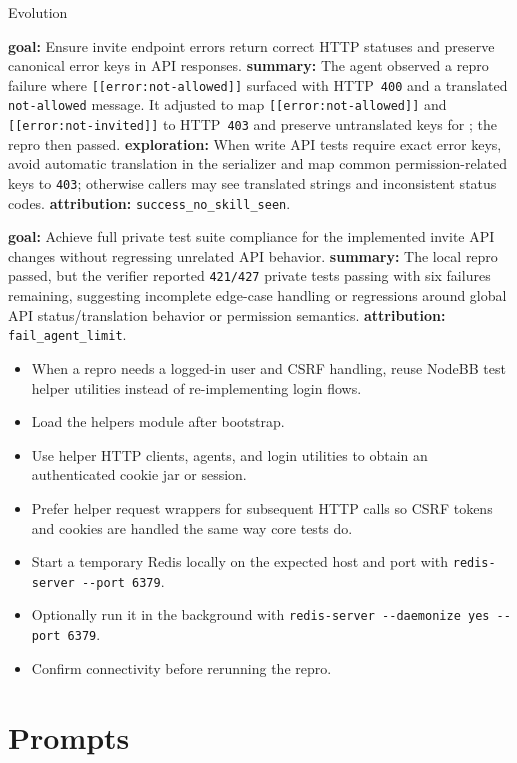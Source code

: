\begin{svpromptbox}{Evolution}
\begin{enumerate}[label=\textnormal{[\arabic*]}, leftmargin=*]
    \item \textbf{goal:} Ensure invite endpoint errors return correct HTTP statuses and preserve canonical error keys in API responses. \textbf{summary:} The agent observed a repro failure where \texttt{[[error:not-allowed]]} surfaced with HTTP~\texttt{400} and a translated \texttt{not-allowed} message. It adjusted  to map \texttt{[[error:not-allowed]]} and \texttt{[[error:not-invited]]} to HTTP~\texttt{403} and preserve untranslated keys for ; the repro then passed. \textbf{exploration:} When write API tests require exact error keys, avoid automatic translation in the  serializer and map common permission-related keys to \texttt{403}; otherwise callers may see translated strings and inconsistent status codes. \textbf{attribution:} \texttt{success\_no\_skill\_seen}.
    \item \textbf{goal:} Achieve full private test suite compliance for the implemented invite API changes without regressing unrelated API behavior. \textbf{summary:} The local repro passed, but the verifier reported \texttt{421/427} private tests passing with six failures remaining, suggesting incomplete edge-case handling or regressions around global API status/translation behavior or permission semantics. \textbf{attribution:} \texttt{fail\_agent\_limit}.
\end{enumerate}

\svpartsep
{}
\begin{itemize}
    \item When a repro needs a logged-in user and CSRF handling, reuse NodeBB test helper utilities instead of re-implementing login flows.
    \item Load the helpers module after bootstrap.
    \item Use helper HTTP clients, agents, and login utilities to obtain an authenticated cookie jar or session.
    \item Prefer helper request wrappers for subsequent HTTP calls so CSRF tokens and cookies are handled the same way core tests do.
\end{itemize}
\begin{itemize}
    \item Start a temporary Redis locally on the expected host and port with \texttt{redis-server -{}-port 6379}.
    \item Optionally run it in the background with \texttt{redis-server -{}-daemonize yes -{}-port 6379}.
    \item Confirm connectivity before rerunning the repro.
\end{itemize}

\end{svpromptbox}

\clearpage
\section{Prompts}
\label{app:prompt}

